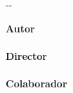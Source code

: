 {\begin{cambiamargen}{-\cambioIzquierdo}{-\cambioDerecho}
\begin{center}
\end{center}

\vfill

\begin{large}
\begin{center}
{\Large \bfseries Autor}\\
\textbf{\autorPortadaVal}\\[0.5cm]
{\Large \bfseries Director}\\
\textbf{\directorPortadaVal}\\[0.5cm]
{\Large \bfseries Colaborador}\\
\textbf{\colaboradorPortadaVal}\\[0.5cm]
\textbf{\institucionVal}\\[1em]
\end{center}
\end{large}

\vfill

\end{cambiamargen}

\newpage

\thispagestyle{empty}
\mbox{ }


\newpage

\thispagestyle{empty}

\mbox{ }

\begin{Huge}
\begin{center}
\tituloPortadaVal \\
\tituloPortadaEngVal
\end{center}
\end{Huge}

}
